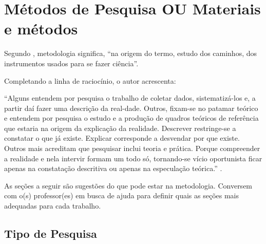\documentclass[
	article,			%
	12pt,				%
	oneside,			%
	a4paper,			%
    BIBLATEX,           %
	english,			%
	brazil,				%
	sumario=tradicional
	]{abntex2}
\begin{document}

\section{Métodos de Pesquisa OU Materiais e métodos}

Segundo , metodologia significa, “na origem do termo, estudo dos caminhos, dos instrumentos usados para se fazer ciência”.

Completando a linha de raciocínio, o autor acrescenta:

    \begin{citacao}
    “Alguns entendem por pesquisa o trabalho de coletar dados, sistematizá-los e, a partir daí fazer uma descrição da real-dade. Outros, fixam-se no patamar teórico e entendem por pesquisa o estudo e a produção de quadros teóricos de referência que estaria na origem da explicação da realidade. Descrever restringe-se a constatar o que já existe. Explicar corresponde a desvendar por que existe. Outros mais acreditam que pesquisar inclui teoria e prática. Porque compreender a realidade e nela intervir formam um todo só, tornando-se vício oportunista ficar apenas na constatação descritiva ou apenas na especulação teórica.”
    \lipsum[5] \cite{PESQUISA:DEMO}.
    \end{citacao}



As seções a seguir são sugestões do que pode estar na metodologia. Conversem com o(s) professor(es) em busca de ajuda para definir quais as seções mais adequadas para cada trabalho.

\subsection{Tipo de Pesquisa}
\lipsum[1]
\end{document}
